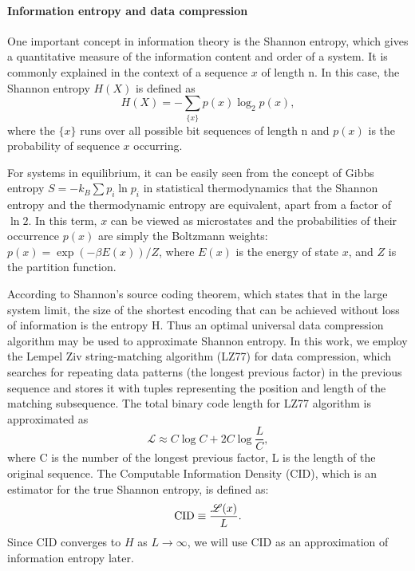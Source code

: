 \documentclass[a4paper]{article}
\begin{document}
\paragraph{Information entropy and data compression}

One important concept in information theory is the Shannon entropy, which gives a quantitative measure of the information content
and order of a system. It is commonly explained in the context of a sequence $x$ of length n. In this case, the Shannon entropy $H(X)$ is defined as
\begin{equation}
H(X)=-\sum_{\{x\}} p(x) \log_2 p(x),
\end{equation}
where the $\{x\}$ runs over all possible bit sequences of length n and $p(x)$ is the probability of sequence $x$ occurring.

For systems in equilibrium, it can be easily seen from the concept of Gibbs entropy $S=-k_B \sum p_i \ln p_i$ in statistical thermodynamics that the Shannon entropy and the thermodynamic entropy are equivalent, apart from a factor of $\ln 2$. In this term, $x$ can be viewed as microstates and the probabilities of their occurrence $p(x)$ are simply the Boltzmann weights: $p(x)=\exp(-\beta E(x))/Z$, where $E(x)$ is the energy of state $x$, and $Z$ is the partition function. 

According to Shannon’s source coding theorem, which states that in
the large system limit, the size of the shortest encoding that can be achieved without loss of information is the entropy H. Thus an optimal universal data compression algorithm may be used to approximate Shannon entropy. In this work, we employ the Lempel Ziv string-matching algorithm (LZ77) for data compression, which searches for repeating data patterns (the longest previous factor) in the previous sequence and stores it with tuples representing the position and length of the matching subsequence. The total binary code length for LZ77 algorithm is approximated as \cite{2017arXiv170804993M}
\begin{equation} \label{eq:length}
\mathscr{L} \approx C \log C + 2 C \log \frac{L}{C}, 
\end{equation}
where C is the number of the longest previous factor, L is the length of the original sequence. The Computable Information Density (CID), which is an estimator for the true Shannon entropy, is defined as:
\begin{equation} \label{eq:CID}
{\rm CID} \equiv \frac{\mathscr{L}(x)}{L}.
\end{equation}
Since CID converges to $H$ as $L \to \infty$, we will use CID as an approximation of information entropy later.
\end{document}
